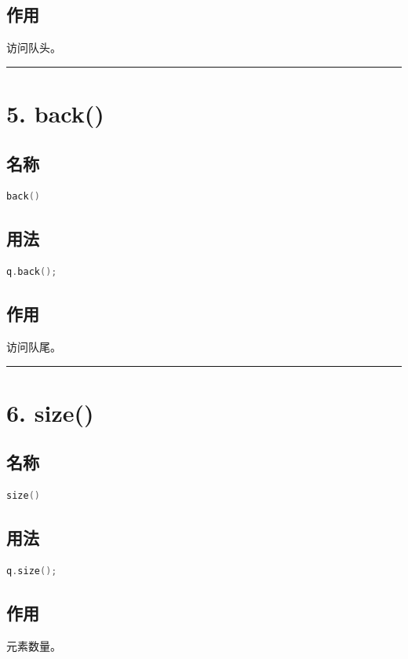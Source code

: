 \documentclass[10pt,twocolumn]{extarticle}
\begin{document}
\subsection{作用}
访问队头。

\noindent\rule{\linewidth}{0.4pt}

\section{5. back()}

\subsection{名称}
\begin{lstlisting}[language=C++]
back()
\end{lstlisting}

\subsection{用法}
\begin{lstlisting}[language=C++]
q.back();
\end{lstlisting}

\subsection{作用}
访问队尾。

\noindent\rule{\linewidth}{0.4pt}

\section{6. size()}

\subsection{名称}
\begin{lstlisting}[language=C++]
size()
\end{lstlisting}

\subsection{用法}
\begin{lstlisting}[language=C++]
q.size();
\end{lstlisting}

\subsection{作用}
元素数量。
\end{document}
